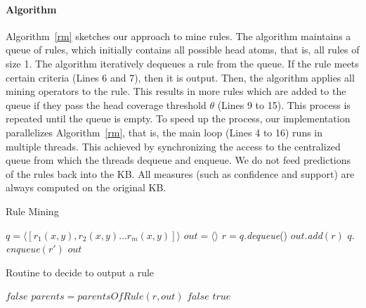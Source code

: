 \paragraph{Algorithm} \label{algo}
Algorithm~\ref{rm} sketches our approach to mine rules. The algorithm maintains a queue of rules, 
which initially contains all possible head atoms, that is,
all rules of size 1.
The algorithm iteratively dequeues a rule from the queue. If the rule 
meets certain criteria (Lines 6 and 7), then it is output.
Then, the algorithm applies all mining operators to the rule. This results in more rules which are added to 
the queue if they pass the head coverage threshold $\theta$ (Lines 9 to 15).
This process is repeated until the queue is empty. 
To speed up the process, our implementation parallelizes Algorithm~\ref{rm}, that is, the main loop (Lines 4 to 16) runs
in multiple threads. 
This achieved by synchronizing the access to the centralized queue from which the threads dequeue and enqueue.
We do not feed predictions of the rules back into the KB. All measures (such as confidence and support) are always computed on the original KB.



\begin{algorithm}
\caption{Rule Mining}
\label{rm}
\begin{algorithmic}[1]
    \State $q = \langle [r_1(x,y), r_2(x,y) \dots r_m(x,y)] \rangle$
    \State $out = \langle \rangle$
	  \State $r = q.$\emph{dequeue}()
	      \State $out.$\emph{add}$(r)$
	    \EndIf
	  \EndIf
		      \State $q.$\emph{enqueue}$(r')$
		    \EndIf
		  \EndIf
		\EndFor
	  \EndFor
	\EndWhile
    \State \Return $out$
\EndFunction
\end{algorithmic}
\end{algorithm}

\begin{algorithm}
\caption{Routine to decide to output a rule}
\label{pfo}
\begin{algorithmic}[1]
      \State \Return $false$
    \EndIf 
    \State $parents = parentsOfRule(r, out)$
	\State \Return $false$
      \EndIf
    \EndFor
    \State \Return $true$
\EndFunction
\end{algorithmic}
\end{algorithm}

